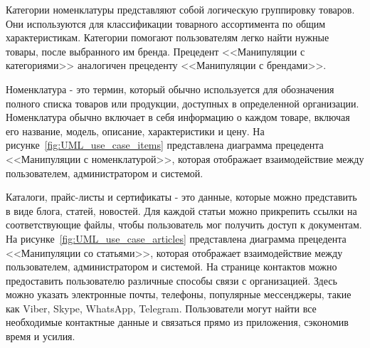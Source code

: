 

Категории номенклатуры представляют собой логическую группировку товаров.
Они используются для классификации товарного ассортимента по общим характеристикам.
Категории помогают пользователям легко найти нужные товары, после выбранного им бренда.
Прецедент <<Манипуляции с категориями>> аналогичен прецеденту <<Манипуляции с брендами>>.

Номенклатура - это термин, который обычно используется для обозначения полного списка товаров или продукции,
доступных в определенной организации.
Номенклатура обычно включает в себя информацию о каждом товаре, включая его название, модель, описание, характеристики и цену.
На рисунке~\ref{fig:UML_use_case_items} представлена диаграмма прецедента <<Манипуляции с номенклатурой>>,
которая отображает взаимодействие между пользователем, администратором и системой.





Каталоги, прайс-листы и сертификаты - это данные, которые можно представить в виде блога, статей, новостей.
Для каждой статьи можно прикрепить ссылки на соответствующие файлы,
чтобы пользователь мог получить доступ к документам.
На рисунке~\ref{fig:UML_use_case_articles} представлена диаграмма прецедента <<Манипуляции со статьями>>,
которая отображает взаимодействие между пользователем, администратором и системой.
На странице контактов можно предоставить пользователю различные способы связи с организацией.
Здесь можно указать электронные почты, телефоны, популярные мессенджеры, такие как Viber, Skype, WhatsApp, Telegram.
Пользователи могут найти все необходимые контактные данные и связаться прямо из приложения, сэкономив время и усилия.



